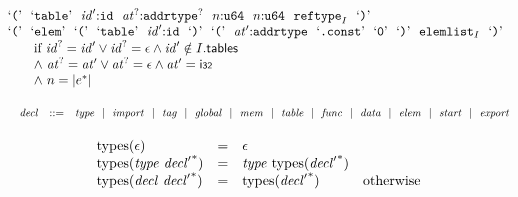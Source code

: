 $$\begin{array}[t]{@{}lrrl@{}l@{}l@{}l@{}}
{\begin{array}[t]{@{}l@{}l@{}l@{}}
\begin{array}[t]{@{}l@{}} \mbox{‘\texttt{{(}}’}~~\mbox{‘\texttt{table}’}~~{\mathit{id}'}{:}{\mathtt{id}}~~{{\mathit{at}}^?}{:}{{\mathtt{addrtype}}^?}~~n{:}{\mathtt{u64}}~~n{:}{\mathtt{u64}}~~{{\mathtt{reftype}}}_{I}~~\mbox{‘\texttt{{)}}’} \\
  \mbox{‘\texttt{{(}}’}~~\mbox{‘\texttt{elem}’}~~\mbox{‘\texttt{{(}}’}~~\mbox{‘\texttt{table}’}~~{\mathit{id}'}{:}{\mathtt{id}}~~\mbox{‘\texttt{{)}}’}~~\mbox{‘\texttt{{(}}’}~~{\mathit{at}'}{:}{\mathtt{addrtype}}~~\mbox{‘\texttt{.const}’}~~\mbox{‘\texttt{0}’}~~\mbox{‘\texttt{{)}}’}~~{{\mathtt{elemlist}}}_{I}~~\mbox{‘\texttt{{)}}’} \end{array} & & \\
 \multicolumn{3}{@{}l@{}}{\quad
\begin{array}[t]{@{}l@{}}
\quad
\begin{array}[t]{@{}l@{}}
\mbox{if}~ {{\mathit{id}}^?} = {\mathit{id}'} \lor {{\mathit{id}}^?} = \epsilon \land {\mathit{id}'} \notin I{.}\mathsf{tables} \\
{\land}~ {{\mathit{at}}^?} = {\mathit{at}'} \lor {{\mathit{at}}^?} = \epsilon \land {\mathit{at}'} = \mathsf{i{\scriptstyle 32}} \\
{\land}~ n = {|{e^\ast}|} \\
\end{array} \\
\end{array}
} \\
\end{array}
} \\
\end{array}
$$

\vspace{1ex}

$$
\begin{array}[t]{@{}lrrl@{}l@{}}
& {\mathit{decl}} & ::= & {\mathit{type}} ~~|~~ {\mathit{import}} ~~|~~ {\mathit{tag}} ~~|~~ {\mathit{global}} ~~|~~ {\mathit{mem}} ~~|~~ {\mathit{table}} ~~|~~ {\mathit{func}} ~~|~~ {\mathit{data}} ~~|~~ {\mathit{elem}} ~~|~~ {\mathit{start}} ~~|~~ {\mathit{export}} \\
\end{array}
$$

$$
\begin{array}[t]{@{}lcl@{}l@{}}
{\mathrm{types}}(\epsilon) & = & \epsilon \\
{\mathrm{types}}({\mathit{type}}~{{\mathit{decl}'}^\ast}) & = & {\mathit{type}}~{\mathrm{types}}({{\mathit{decl}'}^\ast}) \\
{\mathrm{types}}({\mathit{decl}}~{{\mathit{decl}'}^\ast}) & = & {\mathrm{types}}({{\mathit{decl}'}^\ast}) & \quad \mbox{otherwise} \\
\end{array}
$$

